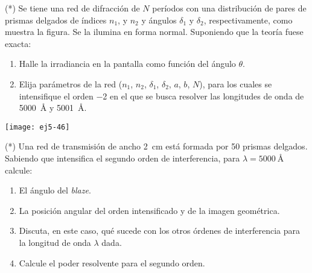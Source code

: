 \item
\begin{minipage}[t][3.5cm]{0.86\textwidth}
(*) Se tiene una red de difracción de $N$ períodos con una distribución de pares de prismas delgados de índices $n_1$, y $n_2$ y ángulos $\delta_1$ y $\delta_2$,
respectivamente, como muestra la figura.
Se la ilumina en forma normal.
Suponiendo que la teoría fuese exacta:
\begin{enumerate}
	\item Halle la irradiancia en la pantalla como función del ángulo $\theta$. 
	\item Elija parámetros de la red ($n_1$, $n_2$, $\delta_1$, $\delta_2$, $a$, $b$, $N$), para los cuales se intensifique el orden \num{-2} en el que se busca resolver las longitudes de onda de \SI{5000}{\angstrom} y \SI{5001}{\angstrom}.
\end{enumerate}
\end{minipage}
\begin{minipage}[c][0cm][t]{0.07\textwidth}
	\texttt{[image: ej5-46]}
\end{minipage}



\item (*) Una red de transmisión de ancho \SI{2}{\centi\metre} está formada por \num{50} prismas delgados.
Sabiendo que intensifica el segundo orden de interferencia, para $\lambda = \SI{5000}{\angstrom}$ calcule: 
\begin{enumerate}
	\item El ángulo del \emph{blaze}. 
	\item La posición angular del orden intensificado y de la imagen geométrica. 
	\item Discuta, en este caso, qué sucede con los otros órdenes de interferencia para la longitud de onda $\lambda$ dada.
	\item Calcule el poder resolvente para el segundo orden. 
\end{enumerate}
